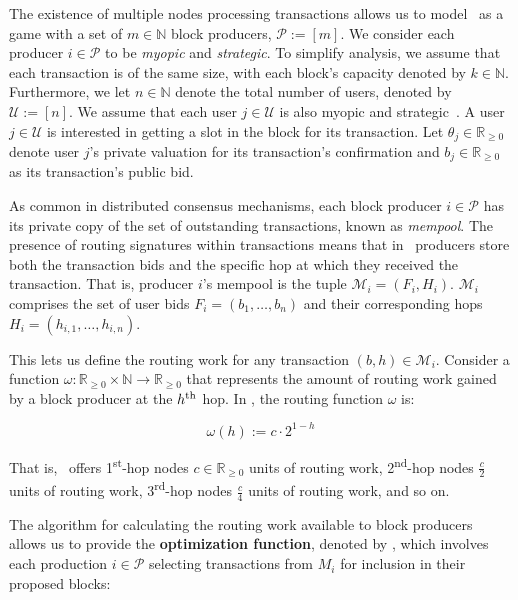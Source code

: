 The existence of multiple nodes processing transactions allows us to model \ourTFM\ as a game with a set of $m\in\mathbb{N}$ block producers, $\mathcal{P}:=[m]$. We consider each producer $i\in \mathcal{P}$ to be \emph{myopic} and \emph{strategic}. To simplify analysis, we assume that each transaction is of the same size, with each block's capacity denoted by $k \in \mathbb{N}$. Furthermore, we let $n\in\mathbb{N}$ denote the total number of users, denoted by $\mathcal{U}:=[n]$. We assume that each user $j\in\mathcal{U}$ is also myopic and strategic~\cite{roughgarden2021,ferreira2021dynamic,chung2023foundations,gafni2024barriers,damle2024designing}. A user $j\in\mathcal{U}$ is interested in getting a slot in the block for its transaction. Let $\theta_{j}\in \mathbb{R}_{\geq 0}$ denote user $j$'s private valuation for its transaction's confirmation and $b_j \in \mathbb{R}_{\geq 0}$ as its transaction's public bid.

As common in distributed consensus mechanisms, each block producer $i\in \mathcal{P}$ has its private copy of the set of outstanding transactions, known as \emph{mempool}. The presence of routing signatures within transactions means that in \ourTFM\ producers store both the transaction bids and the specific hop at which they received the transaction. That is, producer $i$'s mempool is the tuple $\mathcal{M}_i=({F}_i, {H}_i)$. $\mathcal{M}_i$ comprises the set of user bids $F_i = (b_1,\ldots, b_{n})$ and their corresponding hops $H_i = (h_{i,1},\ldots, h_{i,n})$.

This lets us define the routing work for any transaction $(b,h) \in \mathcal{M}_i$. Consider a function $\omega:\mathbb{R}_{\geq 0}\times\mathbb{N}\rightarrow\mathbb{R}_{\geq 0}$ that represents the amount of routing work gained by a block producer at the $h\textsuperscript{th}$ hop. In \ourTFM, the routing function $\omega$ is:

\begin{equation}
    \omega(h) := c\cdot2^{1 - h}
\end{equation}

That is, \ourTFM\ offers 1\textsuperscript{st}-hop nodes $c\in \mathbb{R}_{\geq 0}$ units of routing work, 2\textsuperscript{nd}-hop nodes $\frac{c}{2}$ units of routing work, 3\textsuperscript{rd}-hop nodes $\frac{c}{4}$ units of routing work, and so on.

The algorithm for calculating the routing work available to block producers allows us to provide the \textbf{optimization function}, denoted by \ourOPT, which involves each production $i\in \mathcal{P}$ selecting transactions from $M_i$ for inclusion in their proposed blocks:

